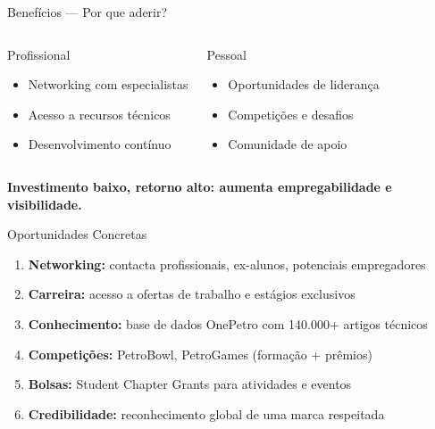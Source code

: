 \documentclass{beamer}
\begin{document}
\begin{frame}{Benefícios — Por que aderir?}
  
  \begin{columns}
    \begin{block}{Profissional}
      \begin{itemize}
        \item Networking com especialistas
        \item Acesso a recursos técnicos
        \item Desenvolvimento contínuo
      \end{itemize}
    \end{block}
    
    \begin{block}{Pessoal}
      \begin{itemize}
        \item Oportunidades de liderança
        \item Competições e desafios
        \item Comunidade de apoio
      \end{itemize}
    \end{block}
  \end{columns}
  
  \vspace{1em}
  
  {\centering\textbf{\color{spe-accent}Investimento baixo, retorno alto: aumenta empregabilidade e visibilidade.}}
\end{frame}

\begin{frame}{Oportunidades Concretas}
  
  \begin{enumerate}[<+->]
    \item[\color{spe-accent}\textbf{🤝}] \textbf{Networking:} contacta profissionais, ex-alunos, potenciais empregadores
    \item[\color{spe-accent}\textbf{💼}] \textbf{Carreira:} acesso a ofertas de trabalho e estágios exclusivos
    \item[\color{spe-accent}\textbf{📚}] \textbf{Conhecimento:} base de dados OnePetro com 140.000+ artigos técnicos
    \item[\color{spe-accent}\textbf{🏆}] \textbf{Competições:} PetroBowl, PetroGames (formação + prêmios)
    \item[\color{spe-accent}\textbf{💰}] \textbf{Bolsas:} Student Chapter Grants para atividades e eventos
    \item[\color{spe-accent}\textbf{⭐}] \textbf{Credibilidade:} reconhecimento global de uma marca respeitada
  \end{enumerate}
\end{frame}
\end{document}
